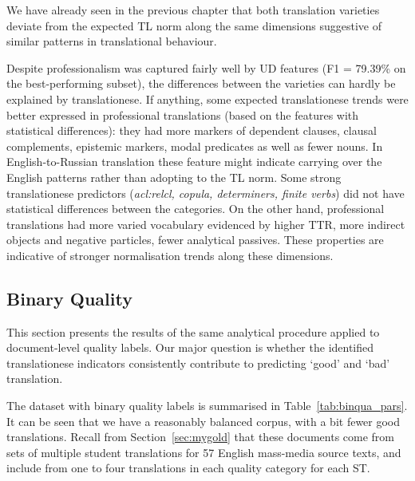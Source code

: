 We have already seen in the previous chapter that both translation varieties deviate from the expected TL norm along the same dimensions suggestive of similar patterns in translational behaviour. 

Despite professionalism was captured fairly well by UD features (F1 = 79.39\% on the best-performing subset), the differences between the varieties can hardly be explained by translationese.
\label{pg:more_professional_more_translated} If anything, some expected translationese trends were better expressed in professional translations (based on the features with statistical differences): they had more markers of dependent clauses, clausal complements, epistemic markers, modal predicates as well as fewer nouns. %
In English-to-Russian translation these feature might indicate carrying over the English patterns rather than adopting to the TL norm. %
Some strong translationese predictors (\textit{acl:relcl, copula, determiners, finite verbs}) did not have statistical differences between the categories.
On the other hand, professional translations had more varied vocabulary evidenced by higher TTR, more indirect objects and negative particles, fewer analytical passives. These properties are indicative of stronger normalisation trends along these dimensions.

\subsection{\label{ssec:bin}Binary Quality}
This section presents the results of the same analytical procedure applied to document-level quality labels. 
Our major question is whether the identified translationese indicators consistently contribute to predicting `good' and `bad' translation. 

The dataset with binary quality labels is summarised in Table~\ref{tab:binqua_pars}. It can be seen that we have a reasonably balanced corpus, with a bit fewer good translations. Recall from Section~\ref{sec:mygold} that these documents come from sets of multiple student translations for 57 English mass-media source texts, and include from one to four translations in each quality category for each ST.

